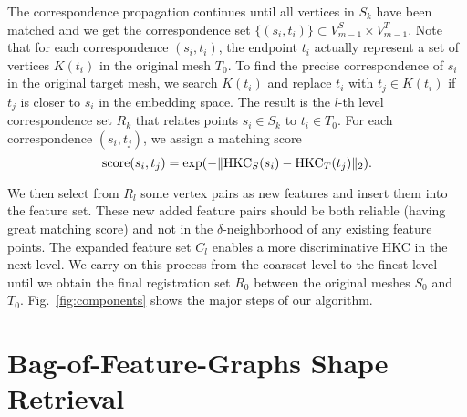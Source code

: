 The correspondence propagation continues until all vertices in $S_k$ have been matched
and we get the correspondence set $\{(s_i,t_i)\} \subset V^S_{m-1} \times V^T_{m-1}$.
Note that for each correspondence $(s_i,t_i)$, the endpoint $t_i$ actually represent a
set of vertices $K(t_i)$ in the original mesh $T_0$. To find the precise correspondence
of $s_i$ in the original target mesh, we search $K(t_i)$ and replace $t_i$ with
$t_j \in K(t_i)$ if $t_j$ is closer to $s_i$ in the embedding space. The result is the
$l$-th level correspondence set $R_k$ that relates points $s_i \in S_k$ to $t_i \in T_0$.
For each correspondence $(s_i,t_j)$, we assign a matching score
\begin{equation}
\text{score}(s_i,t_j)=\exp(-\|{\operatorname*{HKC}}_S(s_i)-{\operatorname*{HKC}}_T(t_j)\|_2).
\end{equation}

We then select from $R_l$ some vertex pairs as new features and insert them into the feature set. These new added feature pairs should be both reliable (having great matching score) and not in the $\delta$-neighborhood of any existing feature points. The expanded feature set $C_l$ enables a more discriminative HKC in the next level. We carry on this process from the coarsest level to the finest level until we obtain the final registration set $R_0$ between the original meshes $S_0$ and $T_0$.
Fig.~\ref{fig:components} shows the major steps of our algorithm.


\section{Bag-of-Feature-Graphs Shape Retrieval}



